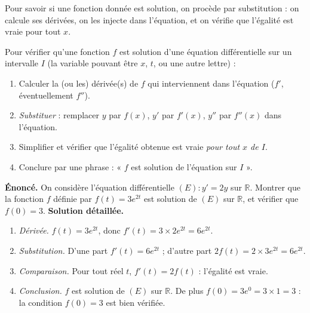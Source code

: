\documentclass[11pt]{article}
\newcommand{\cle}[1]{{\popxbold\color{popdark}#1}}
\begin{document}
Pour savoir si une fonction donnée est solution, on procède par \cle{substitution} : on calcule ses dérivées, on les injecte dans l'équation, et on vérifie que l'égalité est vraie pour tout $x$.

\begin{methode}
Pour vérifier qu'une fonction $f$ est solution d'une équation différentielle sur un intervalle $I$ (la variable pouvant être $x$, $t$, ou une autre lettre) :
\begin{enumerate}
\item Calculer la (ou les) dérivée(s) de $f$ qui interviennent dans l'équation ($f'$, éventuellement $f''$).
\item \emph{Substituer} : remplacer $y$ par $f(x)$, $y'$ par $f'(x)$, $y''$ par $f''(x)$ dans l'équation.
\item Simplifier et vérifier que l'égalité obtenue est vraie \emph{pour tout $x$ de $I$}.
\item Conclure par une phrase : « $f$ est solution de l'équation sur $I$ ».
\end{enumerate}
\end{methode}

\begin{exoresolu}
\textbf{Énoncé.} On considère l'équation différentielle $(E) : y' = 2y$ sur $\mathbb{R}$. Montrer que la fonction $f$ définie par $f(t) = 3e^{2t}$ est solution de $(E)$ sur $\mathbb{R}$, et vérifier que $f(0) = 3$.
\tcblower
\textbf{Solution détaillée.}
\begin{enumerate}
\item \emph{Dérivée.} $f(t) = 3e^{2t}$, donc $f'(t) = 3 \times 2e^{2t} = 6e^{2t}$.
\item \emph{Substitution.} D'une part $f'(t) = 6e^{2t}$ ; d'autre part $2f(t) = 2 \times 3e^{2t} = 6e^{2t}$.
\item \emph{Comparaison.} Pour tout réel $t$, $f'(t) = 2f(t)$ : l'égalité est vraie.
\item \emph{Conclusion.} $f$ est solution de $(E)$ sur $\mathbb{R}$. De plus $f(0) = 3e^{0} = 3 \times 1 = 3$ : la condition $f(0)=3$ est bien vérifiée.
\end{enumerate}
\end{exoresolu}
\end{document}
